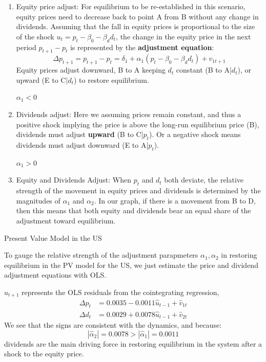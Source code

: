 \documentclass[11pt]{article}
\begin{document}
\begin{enumerate}
    \item Equity price adjust:
    For equilibrium to be re-established in this scenario, equity prices need to decrease back to point A from B without any change in dividends. Assuming that the fall in equity prices is proportional to the size of the shock $u_t = p_t - \beta_0 -\beta_d d_t$, the change in the equity price in the next period $p_{t+1}-p_t$ is represented by the \textbf{adjustment equation}:
    \begin{equation}
\Delta p_{t+1}=p_{t+1}-p_t=\delta_1+\alpha_1\left(p_t-\beta_0-\beta_d d_t\right)+v_{1 t+1}
\end{equation}
Equity prices adjust downward, B to A keeping $d_t$ constant (B to A|$d_t$), or upward (E to C$|d_t$) to restore equilibrium.
\begin{note}
    $\alpha_1<0$
\end{note}
\item Dividends adjust:
Here we assuming prices remain constant, and thus a positive shock implying the price is above the long-run equilibrium price (B), dividends must adjust \textbf{upward} (B to C|$p_t$). Or a negative shock means dividends must adjust downward (E to A|$p_t$).
\begin{note}
    $\alpha_1>0$
\end{note}
\item Equity and Dividends Adjust:
When $p_t$ and $d_t$ both deviate, the relative strength of the movement in equity prices and dividends is determined by the magnitudes of $\alpha_1$ and $\alpha_2$. In our graph, if there is a movement from B to D, then this means that both equity and dividends bear an equal share of the adjustment toward equilibrium.
\end{enumerate}

\begin{example}
    Present Value Model in the US

    To gauge the relative strength of the adjustment parapmeters $\alpha_1, \alpha_2$ in restoring equilibrium in the PV model for the US, we just estimate the price and dividend adjustment equations with OLS.

    $\hat{u}_{t+1}$ represents the OLS residuals from the cointegrating regression, 
    \begin{equation}
\begin{aligned}
\Delta p_t & =0.0035-0.0011 \widehat{u}_{t-1}+\widehat{v}_{1 t} \\
\Delta d_t & =0.0029+0.0078 \widehat{u}_{t-1}+\widehat{v}_{2 t}
\end{aligned}
\end{equation}
We see that the signs are consistent with the dynamics, and because:
\begin{equation}
\left|\widehat{\alpha}_2\right|=0.0078>\left|\widehat{\alpha}_1\right|=0.0011
\end{equation}
dividends are the main driving force in restoring equilibrium in the system after a shock to the equity price.
\end{example}
\end{document}
